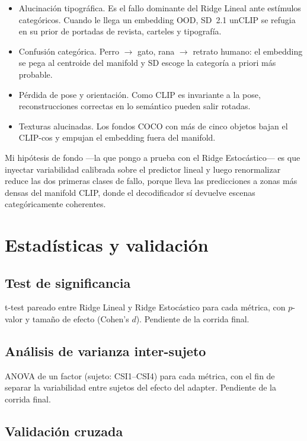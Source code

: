 \begin{itemize}
\item[•] Alucinación tipográfica. Es el fallo dominante del Ridge Lineal ante estímulos 
categóricos. Cuando le llega un embedding OOD, SD~2.1 unCLIP se refugia en su prior de portadas 
de revista, carteles y tipografía.
\item[•] Confusión categórica. Perro $\rightarrow$ gato, rana $\rightarrow$ retrato humano: el 
embedding se pega al centroide del manifold y SD escoge la categoría a priori más probable.
\item[•] Pérdida de pose y orientación. Como CLIP es invariante a la pose, reconstrucciones 
correctas en lo semántico pueden salir rotadas.
\item[•] Texturas alucinadas. Los fondos COCO con más de cinco objetos bajan el CLIP-cos y 
empujan el embedding fuera del manifold.
\end{itemize}

Mi hipótesis de fondo ---la que pongo a prueba con el Ridge Estocástico--- es que inyectar 
variabilidad calibrada sobre el predictor lineal y luego renormalizar reduce las dos primeras 
clases de fallo, porque lleva las predicciones a zonas más densas del manifold CLIP, donde el 
decodificador sí devuelve escenas categóricamente coherentes.

\section{Estadísticas y validación}

\subsection{Test de significancia}

t-test pareado entre Ridge Lineal y Ridge Estocástico para cada métrica, con $p$-valor y tamaño 
de efecto (Cohen's $d$). Pendiente de la corrida final.

\subsection{Análisis de varianza inter-sujeto}

ANOVA de un factor (sujeto: CSI1--CSI4) para cada métrica, con el fin de separar la variabilidad 
entre sujetos del efecto del adapter. Pendiente de la corrida final.

\subsection{Validación cruzada}

